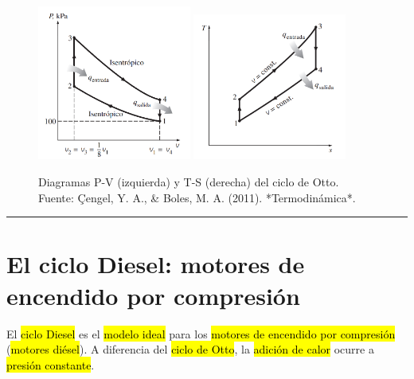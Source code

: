 \documentclass{article}
\begin{document}
\begin{figure}[h!]
    \centering
    \includegraphics[width=0.45\textwidth]{diagrama-PV-Otto.png}
    \hfill
    \includegraphics[width=0.45\textwidth]{diagrama-TS-Otto.png}
    \caption{Diagramas P-V (izquierda) y T-S (derecha) del ciclo de Otto. Fuente: Çengel, Y. A., \& Boles, M. A. (2011). *Termodinámica*.}
    \label{fig:otto_diagrams}
\end{figure}


\hrule

\section{El ciclo Diesel: motores de encendido por compresión}

El \hl{ciclo Diesel} es el \hl{modelo ideal} para los \hl{motores de encendido por compresión} (\hl{motores diésel}). A diferencia del \hl{ciclo de Otto}, la \hl{adición de calor} ocurre a \hl{presión constante}.
\end{document}
